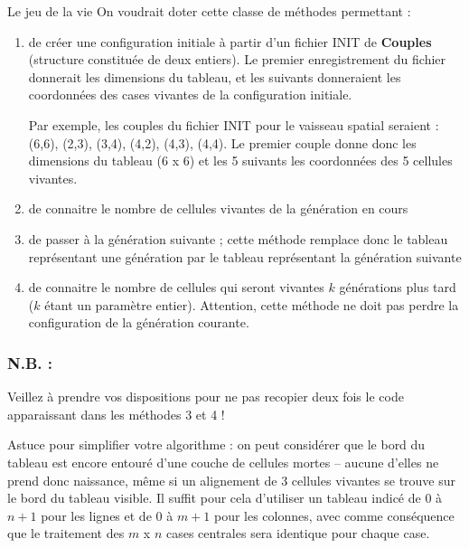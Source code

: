 \begin{Exercice}{Le jeu de la vie}
	On voudrait doter cette classe de méthodes permettant :

	\begin{enumerate}
	\item 
		de créer une configuration initiale à partir
		d’un fichier INIT de \textbf{Couples}
		(structure constituée de deux entiers). 
		Le premier enregistrement du fichier donnerait les dimensions du tableau,
		et les suivants donneraient les coordonnées des cases vivantes de la
		configuration initiale.
		
		Par exemple, les couples du fichier INIT pour le vaisseau spatial
		seraient : (6,6), (2,3), (3,4), (4,2), (4,3), (4,4). Le premier couple
		donne donc les dimensions du tableau (6 x 6) et les 5 suivants les
		coordonnées des 5 cellules vivantes.
	\item 
		de connaitre le nombre de cellules vivantes de la génération en cours
	\item
		de passer à la génération suivante ; cette méthode remplace donc le
		tableau représentant une génération par le tableau représentant la
		génération suivante
	\item
		de connaitre le nombre de cellules qui seront
		vivantes $k$ générations plus tard
		($k$ étant un paramètre entier). 
		Attention, cette méthode ne doit pas perdre la configuration de la génération courante.
	\end{enumerate}

	\subsubsection*{N.B. :}

	\begin{liste}
	\item
		Veillez à prendre vos dispositions pour ne pas recopier deux fois le
		code apparaissant dans les méthodes 3 et 4 !
	\item
		Astuce pour simplifier votre algorithme : 
		on peut considérer que le bord du tableau est encore entouré 
		d’une couche de cellules mortes 
		– aucune d’elles ne prend donc naissance, même si un alignement de 3 cellules
		vivantes se trouve sur le bord du tableau visible. 
		Il suffit pour cela d’utiliser un tableau indicé de $0$ à $n+1$ pour les lignes 
		et de $0$ à $m+1$ pour les colonnes, 
		avec comme conséquence que le traitement des $m$ x $n$ cases centrales 
		sera identique pour chaque case.
	\end{liste}

\end{Exercice}

